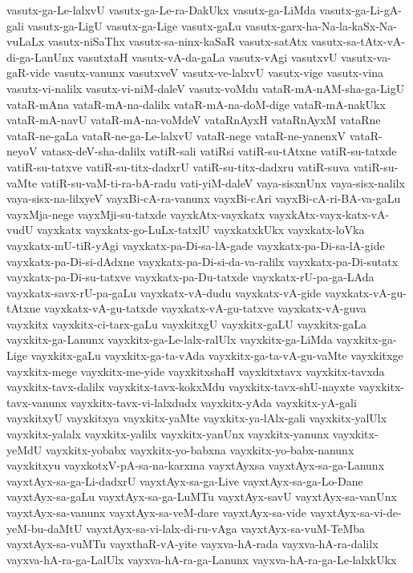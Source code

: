 {vasutx-ga-Le-lalxvU
vasutx-ga-Le-ra-DakUkx
vasutx-ga-LiMda
vasutx-ga-Li-gA-gali
vasutx-ga-LigU
vasutx-ga-Lige
vasutx-gaLu
vasutx-garx-ha-Na-la-kaSx-Na-vuLaLx
vasutx-niSaThx
vasutx-sa-ninx-kaSaR
vasutx-satAtx
vasutx-sa-tAtx-vA-di-ga-LanUnx
vasutxtaH
vasutx-vA-da-gaLa
vasutx-vAgi
vasutxvU
vasutx-va-gaR-vide
vasutx-vanunx
vasutxveV
vasutx-ve-lalxvU
vasutx-vige
vasutx-vina
vasutx-vi-nalilx
vasutx-vi-niM-daleV
vasutx-voMdu
vataR-mA-nAM-sha-ga-LigU
vataR-mAna
vataR-mA-na-dalilx
vataR-mA-na-doM-dige
vataR-mA-nakUkx
vataR-mA-navU
vataR-mA-na-voMdeV
vataRnAyxH
vataRnAyxM
vataRne
vataR-ne-gaLa
vataR-ne-ga-Le-lalxvU
vataR-nege
vataR-ne-yanenxV
vataR-neyoV
vatasx-deV-sha-dalilx
vatiR-sali
vatiRsi
vatiR-su-tAtxne
vatiR-su-tatxde
vatiR-su-tatxve
vatiR-su-titx-dadxrU
vatiR-su-titx-dadxru
vatiR-suva
vatiR-su-vaMte
vatiR-su-vaM-ti-ra-bA-radu
vati-yiM-daleV
vaya-sisxnUnx
vaya-sisx-nalilx
vaya-sisx-na-lilxyeV
vayxBi-cA-ra-vanunx
vayxBi-cAri
vayxBi-cA-ri-BA-va-gaLu
vayxMja-nege
vayxMji-su-tatxde
vayxkAtx-vayxkatx
vayxkAtx-vayx-katx-vA-vudU
vayxkatx
vayxkatx-go-LuLx-tatxlU
vayxkatxkUkx
vayxkatx-loVka
vayxkatx-mU-tiR-yAgi
vayxkatx-pa-Di-sa-lA-gade
vayxkatx-pa-Di-sa-lA-gide
vayxkatx-pa-Di-si-dAdxne
vayxkatx-pa-Di-si-da-va-ralilx
vayxkatx-pa-Di-sutatx
vayxkatx-pa-Di-su-tatxve
vayxkatx-pa-Du-tatxde
vayxkatx-rU-pa-ga-LAda
vayxkatx-savx-rU-pa-gaLu
vayxkatx-vA-dudu
vayxkatx-vA-gide
vayxkatx-vA-gu-tAtxne
vayxkatx-vA-gu-tatxde
vayxkatx-vA-gu-tatxve
vayxkatx-vA-guva
vayxkitx
vayxkitx-ci-tarx-gaLu
vayxkitxgU
vayxkitx-gaLU
vayxkitx-gaLa
vayxkitx-ga-Lanunx
vayxkitx-ga-Le-lalx-ralUlx
vayxkitx-ga-LiMda
vayxkitx-ga-Lige
vayxkitx-gaLu
vayxkitx-ga-ta-vAda
vayxkitx-ga-ta-vA-gu-vaMte
vayxkitxge
vayxkitx-mege
vayxkitx-me-yide
vayxkitxshaH
vayxkitxtavx
vayxkitx-tavxda
vayxkitx-tavx-dalilx
vayxkitx-tavx-kokxMdu
vayxkitx-tavx-shU-nayxte
vayxkitx-tavx-vanunx
vayxkitx-tavx-vi-lalxdudx
vayxkitx-yAda
vayxkitx-yA-gali
vayxkitxyU
vayxkitxya
vayxkitx-yaMte
vayxkitx-ya-lAlx-gali
vayxkitx-yalUlx
vayxkitx-yalalx
vayxkitx-yalilx
vayxkitx-yanUnx
vayxkitx-yanunx
vayxkitx-yeMdU
vayxkitx-yobabx
vayxkitx-yo-babxna
vayxkitx-yo-babx-nanunx
vayxkitxyu
vayxkotxV-pA-sa-na-karxma
vayxtAyxsa
vayxtAyx-sa-ga-Lanunx
vayxtAyx-sa-ga-Li-dadxrU
vayxtAyx-sa-ga-Live
vayxtAyx-sa-ga-Lo-Dane
vayxtAyx-sa-gaLu
vayxtAyx-sa-ga-LuMTu
vayxtAyx-savU
vayxtAyx-sa-vanUnx
vayxtAyx-sa-vanunx
vayxtAyx-sa-veM-dare
vayxtAyx-sa-vide
vayxtAyx-sa-vi-de-yeM-bu-daMtU
vayxtAyx-sa-vi-lalx-di-ru-vAga
vayxtAyx-sa-vuM-TeMba
vayxtAyx-sa-vuMTu
vayxthaR-vA-yite
vayxva-hA-rada
vayxva-hA-ra-dalilx
vayxva-hA-ra-ga-LalUlx
vayxva-hA-ra-ga-Lanunx
vayxva-hA-ra-ga-Le-lalxkUkx
}
